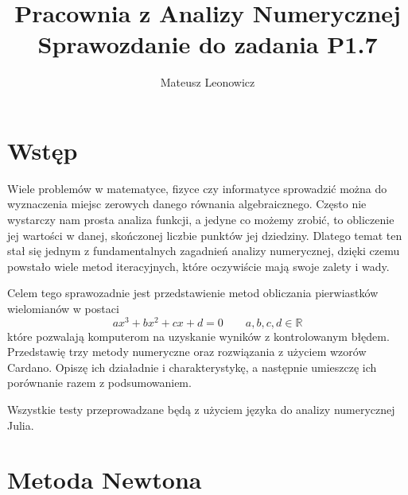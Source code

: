 \documentclass[a4paper]{article}
\title{\textbf{Pracownia z Analizy Numerycznej}\\{\Large Sprawozdanie do zadania P1.7}}
\author{Mateusz Leonowicz}
\begin{document}
\maketitle

\section{Wstęp}
    Wiele problemów w matematyce, fizyce czy informatyce sprowadzić można do wyznaczenia miejsc
    zerowych danego równania algebraicznego. Często nie wystarczy nam prosta analiza funkcji, a
    jedyne co możemy zrobić, to obliczenie jej wartości w danej, skończonej liczbie punktów jej dziedziny.
    Dlatego temat ten stał się jednym z fundamentalnych zagadnień analizy numerycznej, dzięki czemu
    powstało wiele metod iteracyjnych, które oczywiście mają swoje zalety i wady.
    
    \vspace{5mm}

    Celem tego sprawozadnie jest przedstawienie metod obliczania pierwiastków wielomianów w postaci
    \[ax^3 + bx^2 + cx + d = 0 \qquad a, b, c, d \in \mathbb{R}\]
    które pozwalają komputerom na uzyskanie wyników z kontrolowanym błędem. Przedstawię trzy metody numeryczne oraz 
    rozwiązania z użyciem wzorów Cardano. Opiszę ich działadnie i charakterystykę, a następnie umieszczę ich porównanie
    razem z podsumowaniem.

    Wszystkie testy przeprowadzane będą z użyciem języka do analizy numerycznej Julia.
    
\tableofcontents
\newpage

\section{Metoda Newtona}
\end{document}

